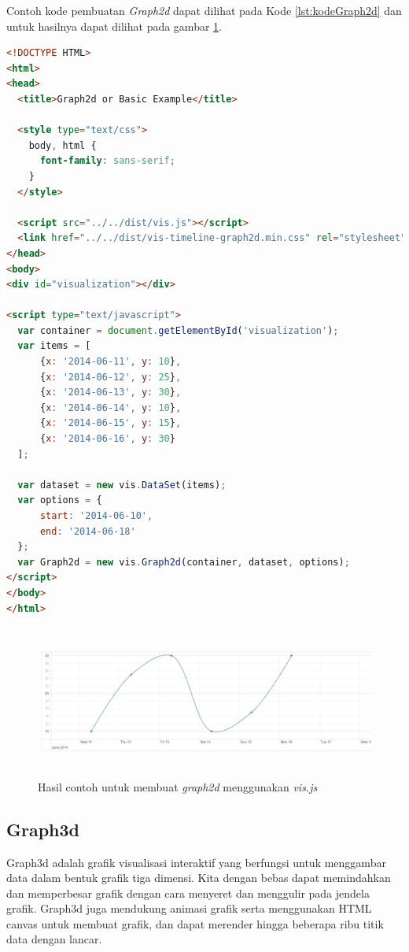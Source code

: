 Contoh kode pembuatan \textit{Graph2d} dapat dilihat pada Kode \ref{lst:kodeGraph2d} dan untuk hasilnya dapat dilihat pada gambar \ref{fig:gambarHasilGraph2d}.

\begin{lstlisting}[language=HTML, caption=Contoh kode untuk membuat \textit{graph2d} menggunakan \textit{vis.js}\label{lst:kodeGraph2d}]
<!DOCTYPE HTML>
<html>
<head>
  <title>Graph2d or Basic Example</title>

  <style type="text/css">
    body, html {
      font-family: sans-serif;
    }
  </style>

  <script src="../../dist/vis.js"></script>
  <link href="../../dist/vis-timeline-graph2d.min.css" rel="stylesheet" type="text/css" />
</head>
<body>
<div id="visualization"></div>

<script type="text/javascript">
  var container = document.getElementById('visualization');
  var items = [
      {x: '2014-06-11', y: 10},
      {x: '2014-06-12', y: 25},
      {x: '2014-06-13', y: 30},
      {x: '2014-06-14', y: 10},
      {x: '2014-06-15', y: 15},
      {x: '2014-06-16', y: 30}
  ];

  var dataset = new vis.DataSet(items);
  var options = {
      start: '2014-06-10',
      end: '2014-06-18'
  };
  var Graph2d = new vis.Graph2d(container, dataset, options);
</script>
</body>
</html>
\end{lstlisting}

\begin{figure}[H]
    \centering
    \includegraphics[width=16.5cm, height=5cm]{Gambar/hasilGraph2d.png}
    \caption{Hasil contoh untuk membuat \textit{graph2d} menggunakan \textit{vis.js}}
    \label{fig:gambarHasilGraph2d}
\end{figure}

\subsection{Graph3d}
Graph3d adalah grafik visualisasi interaktif yang berfungsi untuk menggambar data dalam bentuk grafik tiga dimensi. Kita dengan bebas dapat memindahkan dan memperbesar grafik dengan cara menyeret dan menggulir pada jendela grafik. Graph3d juga mendukung animasi grafik serta menggunakan HTML canvas untuk membuat grafik, dan dapat merender hingga beberapa ribu titik data dengan lancar. \cite{graph3d}

